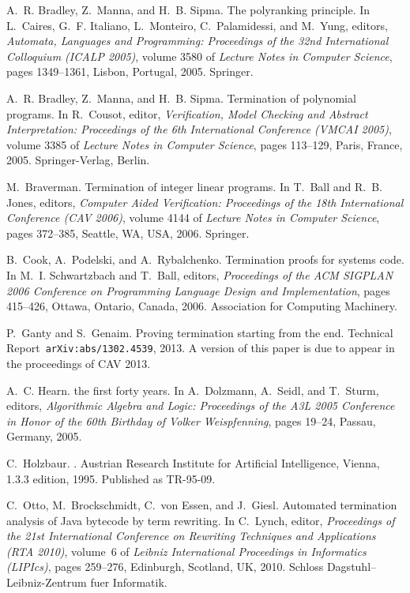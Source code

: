 \documentclass{acm_proc_article-sp}
\begin{document}
\begin{thebibliography}{10}
A.~R. Bradley, Z.~Manna, and H.~B. Sipma.
\newblock The polyranking principle.
\newblock In L.~Caires, G.~F. Italiano, L.~Monteiro, C.~Palamidessi, and
  M.~Yung, editors, {\em Automata, Languages and Programming: Proceedings of
  the 32nd International Colloquium (ICALP 2005)}, volume 3580 of {\em Lecture
  Notes in Computer Science}, pages 1349--1361, Lisbon, Portugal, 2005.
  Springer.

A.~R. Bradley, Z.~Manna, and H.~B. Sipma.
\newblock Termination of polynomial programs.
\newblock In R.~Cousot, editor, {\em Verification, Model Checking and Abstract
  Interpretation: Proceedings of the 6th International Conference (VMCAI
  2005)}, volume 3385 of {\em Lecture Notes in Computer Science}, pages
  113--129, Paris, France, 2005. Springer-Verlag, Berlin.

M.~Braverman.
\newblock Termination of integer linear programs.
\newblock In T.~Ball and R.~B. Jones, editors, {\em Computer Aided
  Verification: Proceedings of the 18th International Conference (CAV 2006)},
  volume 4144 of {\em Lecture Notes in Computer Science}, pages 372--385,
  Seattle, WA, USA, 2006. Springer.

B.~Cook, A.~Podelski, and A.~Rybalchenko.
\newblock Termination proofs for systems code.
\newblock In M.~I. Schwartzbach and T.~Ball, editors, {\em Proceedings of the
  ACM SIGPLAN 2006 Conference on Programming Language Design and
  Implementation}, pages 415--426, Ottawa, Ontario, Canada, 2006. Association
  for Computing Machinery.

P.~Ganty and S.~Genaim.
\newblock Proving termination starting from the end.
\newblock Technical Report~{\tt arXiv:abs/1302.4539}, 2013.
\newblock A version of this paper is due to appear in the proceedings of CAV
  2013.

A.~C. Hearn.
 the first forty years.
\newblock In A.~Dolzmann, A.~Seidl, and T.~Sturm, editors, {\em Algorithmic
  Algebra and Logic: Proceedings of the A3L 2005 Conference in Honor of the
  60th Birthday of Volker Weispfenning}, pages 19--24, Passau, Germany, 2005.

C.~Holzbaur.
.
\newblock Austrian Research Institute for Artificial Intelligence, Vienna,
  1.3.3 edition, 1995.
\newblock Published as TR-95-09.

C.~Otto, M.~Brockschmidt, C.~{von Essen}, and J.~Giesl.
\newblock Automated termination analysis of {Java} bytecode by term rewriting.
\newblock In C.~Lynch, editor, {\em Proceedings of the 21st International
  Conference on Rewriting Techniques and Applications (RTA 2010)}, volume~6 of
  {\em Leibniz International Proceedings in Informatics (LIPIcs)}, pages
  259--276, Edinburgh, Scotland, UK, 2010. Schloss Dagstuhl--Leibniz-Zentrum
  fuer Informatik.


\end{thebibliography}
\end{document}
